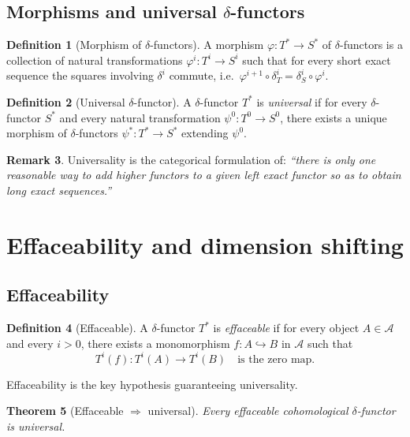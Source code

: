 \documentclass[11pt]{article}
\theoremstyle{definition}
\newtheorem{definition}{Definition}[section]
\newtheorem{remark}[definition]{Remark}
\theoremstyle{plain}
\newtheorem{theorem}[definition]{Theorem}
\begin{document}
\subsection{Morphisms and universal $\delta$-functors}

\begin{definition}[Morphism of $\delta$-functors]\label{def:morphism-delta}
A morphism $\varphi:T^\ast\to S^\ast$ of $\delta$-functors is a collection of natural transformations
$\varphi^i:T^i\to S^i$ such that for every short exact sequence the squares involving $\delta^i$ commute, i.e.\ $\varphi^{i+1}\circ \delta_T^i=\delta_S^i\circ \varphi^i$.
\end{definition}

\begin{definition}[Universal $\delta$-functor]\label{def:universal-delta}
A $\delta$-functor $T^\ast$ is \emph{universal} if for every $\delta$-functor $S^\ast$ and every natural transformation $\psi^0:T^0\to S^0$, there exists a unique morphism of $\delta$-functors $\psi^\ast:T^\ast\to S^\ast$ extending $\psi^0$.
\end{definition}

\begin{remark}
Universality is the categorical formulation of: \emph{``there is only one reasonable way to add higher functors to a given left exact functor so as to obtain long exact sequences.''}
\end{remark}

\section{Effaceability and dimension shifting}

\subsection{Effaceability}

\begin{definition}[Effaceable]\label{def:effaceable}
A $\delta$-functor $T^\ast$ is \emph{effaceable} if for every object $A\in\mathcal{A}$ and every $i>0$, there exists a monomorphism $f:A\hookrightarrow B$ in $\mathcal{A}$ such that
\[
T^i(f):T^i(A)\to T^i(B)
\quad\text{is the zero map.}
\]
\end{definition}

Effaceability is the key hypothesis guaranteeing universality.

\begin{theorem}[Effaceable $\Rightarrow$ universal]\label{thm:effaceable-universal}
Every effaceable cohomological $\delta$-functor is universal.
\end{theorem}
\end{document}
